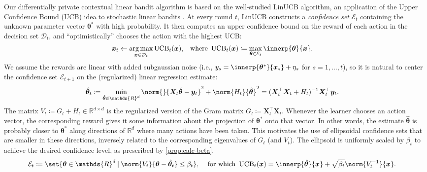 \documentclass{article}
\renewcommand{\vec}[1]{\bm{#1}}
\newcommand{\defeq}{\coloneq}
\newcommand{\inv}[1]{#1^{-1}}
\newcommand{\Real}{\mathds{R}}
\newcommand{\UCB}{\operatorname{UCB}}
\DeclareMathOperator*{\argmax}{arg\,max}
\newcommand\given[1][\delimsize]{%
  \providecommand{\delimsize}{}
  \nonscript\:#1\vert\allowbreak\nonscript\:\mathopen{}
}
\newcommand{\E}{\mathcal{E}}
\providecommand\transp{\top}
\let\transpsymbol\transp
\renewcommand{\transp}[1]{#1^\transpsymbol}
\newcommand{\Dset}[1]{\mathcal{D}_{#1}}
\newcommand{\XtX}[1]{\transp{#1}{#1}}
\begin{document}
Our differentially private contextual linear bandit algorithm is based
on the well-studied LinUCB algorithm, an application of the Upper
Confidence Bound (UCB) idea to stochastic linear bandits
\citep{DaniStochasticLinearOptimization2008,RusmevichientongLinearlyParameterizedBandits2010,AbbasiYadkoriImprovedAlgorithmsLinear2011}.
At every round $t$, LinUCB constructs a \emph{confidence set} $\E_t$
containing the unknown parameter vector $\vec\theta^*$ with high
probability.  It then computes an upper confidence bound on the reward
of each action in the decision set $\Dset{t}$, and ``optimistically''
chooses the action with the highest UCB:
\begin{align}\label{eq:def-ucb}
  \vec x_t &\gets \argmax_{\vec x\in\Dset{t}} \UCB_t(\vec x),
  &\text{where }
  \UCB_t(\vec x) &\defeq \max_{\vec\theta\in\E_t} \innerp{\vec\theta}{\vec x}.
\end{align}
We assume the rewards are linear with added subgaussian noise (i.e.,
$y_s = \innerp{\vec\theta^*}{\vec x_s} + \eta_s$ for $s=1,\dotsc,t$), so it
is natural to center the confidence set $\E_{t+1}$ on the
(regularized) linear regression estimate:
\begin{align*}
  \hat{\vec\theta}_t &\defeq \min_{\hat{\vec\theta} \in \Real^d} \norm{}{\vec X_t \hat{\vec\theta} - \vec y_t}^2 + \norm{H_t}{\hat{\vec\theta}}^2
  = \inv{(\XtX{\vec X_t} + H_t)} \transp{\vec X_t} \vec y_t.
\end{align*}
The matrix $V_t \defeq G_t + H_t \in \Real^{d\times d}$ is the regularized
version of the Gram matrix $G_t \defeq \XtX{\vec X_t}$.  Whenever the
learner chooses an action vector, the corresponding reward gives it
some information about the projection of $\vec\theta^*$ onto that
vector.  In other words, the estimate $\hat{\vec\theta}$ is probably
closer to $\vec\theta^*$ along directions of $\Real^d$ where many
actions have been taken.  This motivates the use of ellipsoidal
confidence sets that are smaller in these directions, inversely
related to the corresponding eigenvalues of $G_t$ (and $V_t$). The
ellipsoid is uniformly scaled by $\beta_t$ to achieve the desired
confidence level, as prescribed by \cref{prop:calc-beta}.
\begin{align}\label{eq:def-ellip}
  \E_t &\defeq \set{\vec\theta\in\Real^d \given
        \norm{V_t}{\vec\theta-\hat{\vec\theta}_t} \le \beta_t},
  &\text{ for which }
    \UCB_t(\vec x) &= \innerp{\hat{\vec\theta}}{\vec x} + \sqrt{\beta_t}\norm{\inv{V_t}}{\vec x}.
\end{align}
\end{document}
